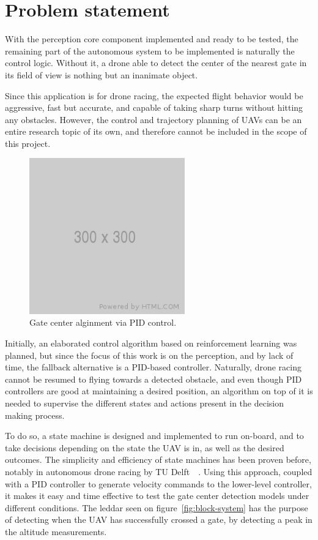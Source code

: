 \section{Problem statement}

With the perception core component implemented and ready to be tested, the
remaining part of the autonomous system to be implemented is naturally the
control logic. Without it, a drone able to detect the center of the nearest
gate in its field of view is nothing but an inanimate object.

Since this application is for drone racing, the expected flight behavior would
be aggressive, fast but accurate, and capable of taking sharp turns without
hitting any obstacles. However, the control and trajectory planning of UAVs can
be an entire research topic of its own, and therefore cannot be included in the
scope of this project.\\

\begin{figure}[h]
	\centering
	\includegraphics[width=0.6\textwidth]{figure/300x300.png}
	\caption{Gate center alginment via PID control.}
\end{figure}

Initially, an elaborated control algorithm based on reinforcement learning was
planned, but since the focus of this work is on the perception, and by lack of
time, the fallback alternative is a PID-based controller. Naturally, drone
racing cannot be resumed to flying towards a detected obstacle, and even though
PID controllers are good at maintaining a desired position, an algorithm on top
of it is needed to supervise the different states and actions present in the
decision making process.

To do so, a state machine is designed and implemented to run on-board, and to
take decisions depending on the state the UAV is in, as well as the desired
outcomes. The simplicity and efficiency of state machines has been proven
before, notably in autonomous drone racing by TU Delft~\etal~\cite{State
Machine based High Level Navigation}. 
Using this approach, coupled with a PID controller to generate velocity
commands to the lower-level controller, it makes it easy and time effective to
test the gate center detection models under different conditions. The leddar
seen on figure~\ref{fig:block-system} has the purpose of detecting when the
UAV has successfully crossed a gate, by detecting a peak in the altitude
measurements.\\

